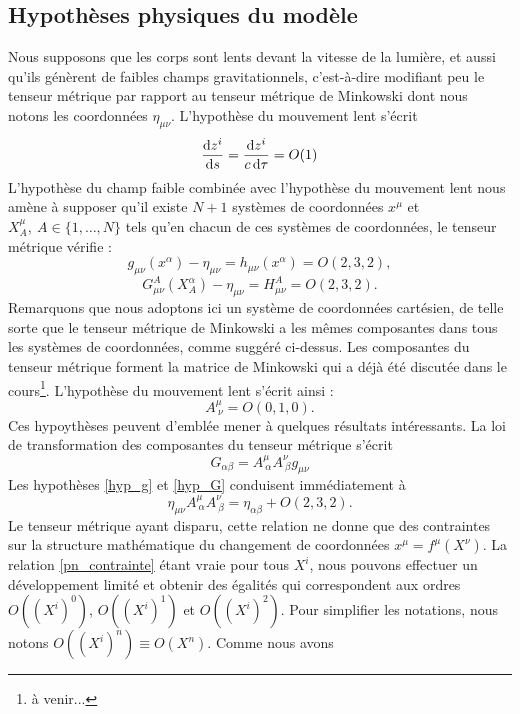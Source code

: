 		\subsection{Hypothèses physiques du modèle}
			Nous supposons que les corps sont lents devant la vitesse de la lumière, et aussi qu'ils génèrent de faibles champs gravitationnels, c'est-à-dire modifiant peu le tenseur métrique par rapport au tenseur métrique de Minkowski dont nous notons les coordonnées $\eta_{\mu\nu}$.
			L'hypothèse du mouvement lent s'écrit
			\begin{equation}
				\frac{\mathrm{d} z^i}{\mathrm{d} s} = \frac{\mathrm{d} z^i}{c \, \mathrm{d} \tau} = O(1)
			\end{equation}
			L'hypothèse du champ faible combinée avec l'hypothèse du mouvement lent nous amène à supposer qu'il existe $N+1$ systèmes de coordonnées $x^\mu$ et $X^\mu_A,\ A\in\{1,\ldots,N\}$ tels qu'en chacun de ces systèmes de coordonnées, le tenseur métrique vérifie :
			\begin{equation}\label{hyp_g}
				g_{\mu\nu}(x^\alpha)-\eta_{\mu\nu}=h_{\mu\nu}(x^\alpha)=O(2,3,2),
			\end{equation}
			\begin{equation}\label{hyp_G}
				G^A_{\mu\nu}(X^\alpha_A)-\eta_{\mu\nu}=H^A_{\mu\nu}=O(2,3,2).
			\end{equation}
			Remarquons que nous adoptons ici un système de coordonnées cartésien, de telle sorte que le tenseur métrique de Minkowski a les mêmes composantes dans tous les systèmes de coordonnées, comme suggéré ci-dessus. Les composantes du tenseur métrique forment la matrice de Minkowski qui a déjà été discutée dans le cours\footnote{à venir...}.
			L'hypothèse du mouvement lent s'écrit ainsi :
			\begin{equation}
				A^\mu_{\ \nu}=O(0,1,0). \label{hyp_v}
			\end{equation}
			Ces hypoythèses peuvent d'emblée mener à quelques résultats intéressants. La loi de transformation des composantes du tenseur métrique s'écrit
			\begin{equation}
				G_{\alpha\beta}=A^\mu_{\ \alpha}A^\nu_{\ \beta}g_{\mu\nu}
			\end{equation}
			Les hypothèses \ref{hyp_g} et \ref{hyp_G} conduisent immédiatement à 
			\begin{equation}\label{pn_contrainte}
				\eta_{\mu\nu}A^\mu_{\ \alpha}A^\nu_{\ \beta} = \eta_{\alpha\beta}+O(2,3,2).
			\end{equation}
			Le tenseur métrique ayant disparu, cette relation ne donne que des contraintes sur la structure mathématique du changement de coordonnées $x^\mu=f^\mu(X^\nu)$. La relation \ref{pn_contrainte} étant vraie pour tous $X^i$, nous pouvons effectuer un développement limité et obtenir des égalités qui correspondent aux ordres $O((X^i)^0)$, $O((X^i)^1)$ et $O((X^i)^2)$. Pour simplifier les notations, nous notons $O((X^i)^n)\equiv O(X^n)$. Comme nous avons 
